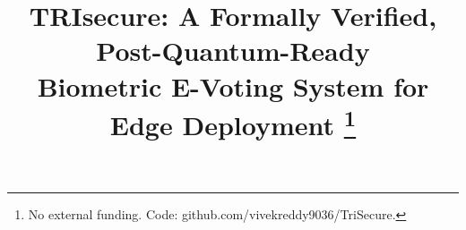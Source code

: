 \documentclass[conference]{IEEEtran}
\begin{document}
\title{TRIsecure: A Formally Verified, Post-Quantum-Ready\\
Biometric E-Voting System for Edge Deployment%
\thanks{No external funding. Code: github.com/vivekreddy9036/TriSecure.}}

\author{
}

\maketitle

\end{document}
